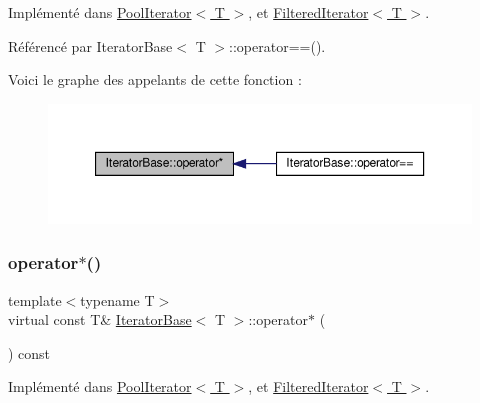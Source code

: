 Implémenté dans \hyperlink{class_pool_iterator_a3acdd751b297473d78eedb7422c7a66c}{Pool\+Iterator$<$ T $>$}, et \hyperlink{class_filtered_iterator_ac891b168cd653612ddc7ed7cb4380196}{Filtered\+Iterator$<$ T $>$}.



Référencé par Iterator\+Base$<$ T $>$\+::operator==().

Voici le graphe des appelants de cette fonction \+:\nopagebreak
\begin{figure}[H]
\begin{center}
\leavevmode
\includegraphics[width=350pt]{class_iterator_base_a532583e58bce168648bdbdedb3a7d5ab_icgraph}
\end{center}
\end{figure}
\mbox{\label{class_iterator_base_abc219468b68f2b5471494d04d00f6ec7}} 
\subsubsection{\texorpdfstring{operator$\ast$()}{operator*()}\hspace{0.1cm}{\footnotesize\ttfamily [2/2]}}
{\footnotesize\ttfamily template$<$typename T$>$ \\
virtual const T\& \hyperlink{class_iterator_base}{Iterator\+Base}$<$ T $>$\+::operator$\ast$ (\begin{DoxyParamCaption}{ }\end{DoxyParamCaption}) const\hspace{0.3cm}{\ttfamily [pure virtual]}}



Implémenté dans \hyperlink{class_pool_iterator_ab8a7e0669bfd1cd4335ca726bba77127}{Pool\+Iterator$<$ T $>$}, et \hyperlink{class_filtered_iterator_aab76ce411b72c85c3e6a9007a6c9fd98}{Filtered\+Iterator$<$ T $>$}.

\mbox{\label{class_iterator_base_a816f35e9020716d212124a34f1c033fb}} 
